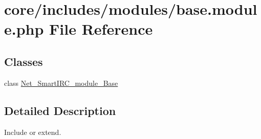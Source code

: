 \hypertarget{base_8module_8php}{}\section{core/includes/modules/base.module.\+php File Reference}
\label{base_8module_8php}
\subsection*{Classes}
\begin{DoxyCompactItemize}
\item 
class \hyperlink{classNet__SmartIRC__module__Base}{Net\+\_\+\+Smart\+I\+R\+C\+\_\+module\+\_\+\+Base}
\end{DoxyCompactItemize}


\subsection{Detailed Description}
Include or extend. 